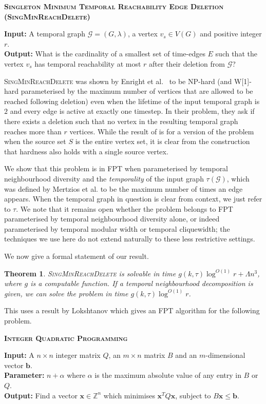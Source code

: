 \documentclass[preprint,12pt]{elsarticle}
\makeatletter
\newtheorem{theorem}{Theorem}
\newcommand{\decisionproblem}[3]{%
\begin{framed}
\vspace{0,1cm} \noindent
 \textbf{\textsc{#1} }
\par%
\noindent
{\bf{Input:}}  #2\\%
{\bf{Output:}} #3%
\end{framed}
}
\newcommand{\decisionproblemparam}[4]{%
\begin{framed}
\vspace{0,1cm} \noindent 
 \textbf{\textsc{#1} }
  \vspace{1.2mm}%
\par%
\noindent
{\bf{Input:}}  #2\\%
{\bf{Parameter:}}  #3\\%
{\bf{Output:}} #4%
\end{framed}
}
\makeatother
\begin{document}
\label{MinTRED}
\decisionproblem{Singleton Minimum Temporal Reachability Edge Deletion (SingMinReachDelete)}{A temporal graph $\mathcal{G}=(G,\lambda)$, a vertex $v_s \in V(G)$ and positive integer $r$.}{What is the cardinality of a smallest set of time-edges $E$ such that the vertex $v_s$ has temporal reachability at most $r$ after their deletion from $\mathcal{G}$?}

\textsc{SingMinReachDelete} was shown by Enright et al.~\cite{enright_deleting_2021} to be NP-hard (and W[1]-hard parameterised by the maximum number of vertices that are allowed to be reached following deletion) even when the lifetime of the input temporal graph is $2$ and every edge is active at exactly one timestep. In their problem, they ask if there exists a deletion such that no vertex in the resulting temporal graph reaches more than $r$ vertices.
While the result of \cite{enright_deleting_2021} is for a version of the problem when the source set $S$ is the entire vertex set, it is clear from the construction that hardness also holds with a single source vertex. 

We show that this problem is in FPT when parameterised by temporal neighbourhood diversity and the \emph{temporality} of the input graph $\tau(\mathcal{G})$, which was defined by Mertzios et al. \cite{mertzios_temporal_2019} to be the maximum number of times an edge appears.  When the temporal graph in question is clear from context, we just refer to $\tau$.  We note that it remains open whether the problem belongs to FPT parameterised by temporal neighbourhood diversity alone, or indeed parameterised by temporal modular width or temporal cliquewidth; the techniques we use here do not extend naturally to these less restrictive settings.

We now give a formal statement of our result.

\begin{theorem}\label{thm:iqp}
    \textsc{SingMinReachDelete} is solvable in time $g(k,\tau)\log^{O(1)}r + \Lambda n^3$, where $g$ is a computable function.  If a temporal neighbourhood decomposition is given, we can solve the problem in time $g(k,\tau)\log^{O(1)} r$.
\end{theorem}
This uses a result by Lokshtanov \cite{lokshtanov_parameterized_2017} which gives an FPT algorithm for the following problem.

\decisionproblemparam{Integer Quadratic Programming}{A $n\times n$ integer matrix $Q$, an $m\times n$ matrix $B$ and an $m$-dimensional vector $\textbf{b}$.}{$n+\alpha$ where $\alpha$ is the maximum absolute value of any entry in $B$ or $Q$.}{Find a vector $\textbf{x}\in \mathbb{Z}^n$ which minimises $\textbf{x}^TQ\textbf{x}$, subject to $B\textbf{x}\leq \textbf{b}$.}
\end{document}
